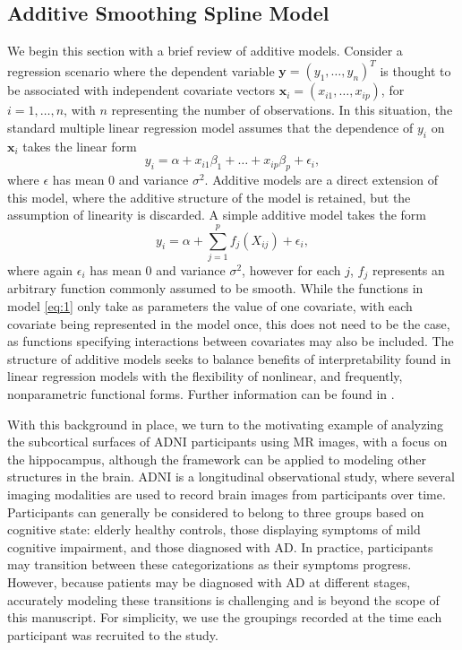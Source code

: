 \documentclass[11pt,reqno]{article}
\theoremstyle{definition}
\begin{document}
\subsection{Additive Smoothing Spline Model}

We begin this section with a brief review of additive models. Consider a regression scenario where the dependent variable $\mathbf{y} = \left(y_1, \dots, y_n\right)^{T}$ is thought to be associated with independent covariate vectors $\mathbf{x}_i = \left(x_{i1}, \dots, x_{ip}\right)$, for $i = 1, \dots, n$, with $n$ representing the number of observations. In this situation, the standard multiple linear regression model assumes that the dependence of $y_i$ on $\mathbf{x}_i$ takes the linear form
\[%
  y_i = \alpha + x_{i1}\beta_1 + \dots + x_{ip}\beta_p + \epsilon_i
,\]%
where $\epsilon$ has mean 0 and variance $\sigma^2$. Additive models are a direct extension of this model, where the additive structure of the model is retained, but the assumption of linearity is discarded. A simple additive model takes the form
\begin{equation}
  y_i = \alpha + \sum_{j=1}^{p}f_j(X_{ij}) + \epsilon_i, \label{eq:1}
\end{equation}
where again $\epsilon_i$ has mean 0 and variance $\sigma^2$, however for each $j$, $f_j$ represents an arbitrary function commonly assumed to be smooth. While the functions in model \ref{eq:1} only take as parameters the value of one covariate, with each covariate being represented in the model once, this does not need to be the case, as functions specifying interactions between covariates may also be included. The structure of additive models seeks to balance benefits of interpretability found in linear regression models with the flexibility of nonlinear, and frequently, nonparametric functional forms. Further information can be found in \cite{hastieGeneralizedAdditiveModels1990}.

With this background in place, we turn to the motivating example of analyzing the subcortical surfaces of ADNI participants using MR images, with a focus on the hippocampus, although the framework can be applied to modeling other structures in the brain. ADNI is a longitudinal observational study, where several imaging modalities are used to record brain images from participants over time. Participants can generally be considered to belong to three groups based on cognitive state: elderly healthy controls, those displaying symptoms of mild cognitive impairment, and those diagnosed with AD. In practice, participants may transition between these categorizations as their symptoms progress. However, because patients may be diagnosed with AD at different stages, accurately modeling these transitions is challenging and is beyond the scope of this manuscript. For simplicity, we use the groupings recorded at the time each participant was recruited to the study. 
\end{document}
